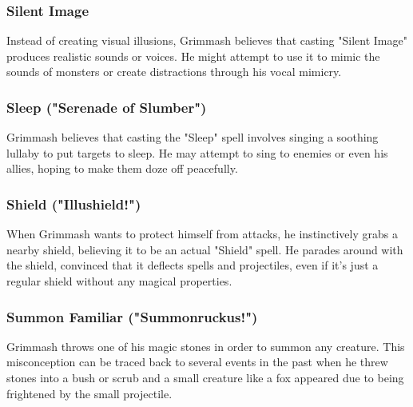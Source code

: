 \documentclass[letterpaper,openany,oneside,twocolumn]{book}
\newcommand{\PATH}{../../}
\begin{document}
\subsubsection*{Silent Image}
Instead of creating visual illusions, Grimmash believes that casting "Silent Image" produces realistic sounds or voices. He might attempt to use it to mimic the sounds of monsters or create distractions through his vocal mimicry.
\subsubsection*{Sleep ("Serenade of Slumber")}
Grimmash believes that casting the "Sleep" spell involves singing a soothing lullaby to put targets to sleep. He may attempt to sing to enemies or even his allies, hoping to make them doze off peacefully.
\subsubsection*{Shield ("Illushield!")}
When Grimmash wants to protect himself from attacks, he instinctively grabs a nearby shield, believing it to be an actual "Shield" spell. He parades around with the shield, convinced that it deflects spells and projectiles, even if it's just a regular shield without any magical properties.
\subsubsection*{Summon Familiar ("Summonruckus!")}
Grimmash throws one of his magic stones in order to summon any creature. This misconception can be traced back to several events in the past when he threw stones into a bush or scrub and a small creature like a fox appeared due to being frightened by the small projectile.


\end{document}
